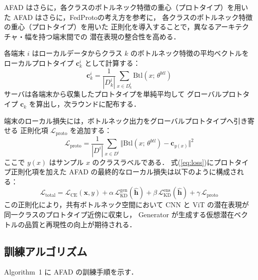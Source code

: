 \documentclass[Japanese,noauthor]{dicomopapers}
\begin{document}
AFAD はさらに，各クラスのボトルネック特徴の重心（プロトタイプ）を用いた
AFAD はさらに，FedProto\cite{FedProto}の考え方を参考に，
各クラスのボトルネック特徴の重心（プロトタイプ）を用いた
正則化を導入することで，異なるアーキテクチャ・幅を持つ端末間での
潜在表現の整合性を高める．

各端末 $i$ はローカルデータからクラス $k$ のボトルネック特徴の平均ベクトルを
ローカルプロトタイプ $\mathbf{c}_k^i$ として計算する：
\begin{equation}
  \mathbf{c}_k^i = \frac{1}{|D_k^i|} \sum_{x \in D_k^i} \mathrm{Btl}(x;\,\theta^{btl})
  \label{eq:prototype}
\end{equation}
サーバは各端末から収集したプロトタイプを単純平均して
グローバルプロトタイプ $\mathbf{c}_k$ を算出し，次ラウンドに配布する．

端末のローカル損失には，ボトルネック出力をグローバルプロトタイプへ引き寄せる
正則化項 $\mathcal{L}_{\mathrm{proto}}$ を追加する：
\begin{equation}
  \mathcal{L}_{\mathrm{proto}} = \frac{1}{|D^i|}
    \sum_{x \in D^i} \bigl\Vert \mathrm{Btl}(x;\,\theta^{btl}) - \mathbf{c}_{y(x)} \bigr\Vert^2
  \label{eq:proto_loss}
\end{equation}
ここで $y(x)$ はサンプル $x$ のクラスラベルである．
式(\ref{eq:loss})にプロトタイプ正則化項を加えた
AFAD の最終的なローカル損失は以下のように構成される：
\begin{equation}
  \mathcal{L}_{\mathrm{total}} = \mathcal{L}_{\mathrm{CE}}(\mathbf{x}, y)
    + \alpha \, \mathcal{L}_{\mathrm{KD}}^{\mathrm{gen}}(\hat{\mathbf{h}})
    + \beta  \, \mathcal{L}_{\mathrm{KD}}^{\mathrm{ens}}(\hat{\mathbf{h}})
    + \gamma \, \mathcal{L}_{\mathrm{proto}}
  \label{eq:loss_total}
\end{equation}
この正則化により，共有ボトルネック空間において
CNN と ViT の潜在表現が同一クラスのプロトタイプ近傍に収束し，
Generator が生成する仮想潜在ベクトルの品質と再現性の向上が期待される．

\subsection{訓練アルゴリズム}

Algorithm~1 に AFAD の訓練手順を示す．
\end{document}
